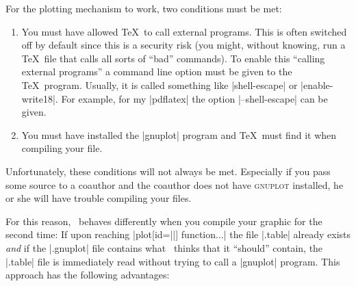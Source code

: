 For the plotting mechanism to work, two conditions must be met:
\begin{enumerate}
\item
  You must have allowed \TeX\ to call external programs. This is often
  switched off by default since this is a security risk (you might,
  without knowing, run a \TeX\ file that calls all sorts of ``bad''
  commands). To enable this ``calling external programs'' a command
  line option must be given to the \TeX\ program. Usually, it is
  called something like |shell-escape| or |enable-write18|. For
  example, for my |pdflatex| the option |--shell-escape| can be
  given.
\item
  You must have installed the |gnuplot| program and \TeX\ must find it
  when compiling your file.
\end{enumerate}

Unfortunately, these conditions will not always be met. Especially if
you pass some source to a coauthor and the coauthor does not have
\textsc{gnuplot} installed, he or she will have trouble compiling your
files.

For this reason, \tikzname\ behaves differently when you compile your
graphic for the second time: If upon reaching
|plot[id=||] function{...}| the file |.table|
already exists \emph{and} if the |.gnuplot| file
contains what \tikzname\ thinks that it ``should'' contain, the |.table|
file is immediately read without trying to call a |gnuplot|
program. This approach has the following advantages:

